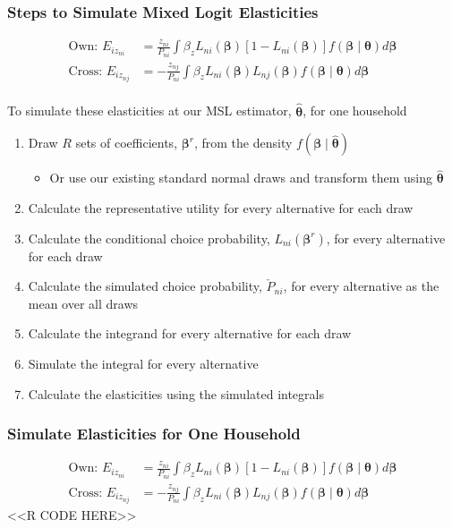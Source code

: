 \documentclass{beamer}
\begin{document}
\begin{frame}\frametitle{Steps to Simulate Mixed Logit Elasticities}
	\vspace{-3ex}
	\begin{align*}
    	\text{Own: } E_{iz_{ni}} & = \frac{z_{ni}}{P_{ni}} \int \beta_z L_{ni}(\bm{\beta}) [1 - L_{ni}(\bm{\beta})] f(\bm{\beta} \mid \bm{\theta}) d \bm{\beta} \\
    	\text{Cross: } E_{iz_{nj}} & = - \frac{z_{nj}}{P_{ni}} \int \beta_z L_{ni}(\bm{\beta}) L_{nj}(\bm{\beta}) f(\bm{\beta} \mid \bm{\theta}) d \bm{\beta}
    \end{align*} \\
    \vspace{-1ex}
    To simulate these elasticities at our MSL estimator, $\widehat{\bm{\theta}}$, for one household
    \begin{enumerate}
        \item Draw $R$ sets of coefficients, $\bm{\beta}^r$, from the density $f(\bm{\beta} \mid \widehat{\bm{\theta}})$
        \begin{itemize}
        	\item Or use our existing standard normal draws and transform them using $\widehat{\bm{\theta}}$
        \end{itemize}
        \item Calculate the representative utility for every alternative for each draw
        \item Calculate the conditional choice probability, $L_{ni}(\bm{\beta}^r)$, for every alternative for each draw
        \item Calculate the simulated choice probability, $\check{P}_{ni}$, for every alternative as the mean over all draws
        \item Calculate the integrand for every alternative for each draw
        \item Simulate the integral for every alternative
        \item Calculate the elasticities using the simulated integrals
    \end{enumerate}
\end{frame}

\begin{frame}[fragile]\frametitle{Simulate Elasticities for One Household}
	\vspace{-3ex}
	\begin{align*}
    	\text{Own: } E_{iz_{ni}} & = \frac{z_{ni}}{P_{ni}} \int \beta_z L_{ni}(\bm{\beta}) [1 - L_{ni}(\bm{\beta})] f(\bm{\beta} \mid \bm{\theta}) d \bm{\beta} \\
    	\text{Cross: } E_{iz_{nj}} & = - \frac{z_{nj}}{P_{ni}} \int \beta_z L_{ni}(\bm{\beta}) L_{nj}(\bm{\beta}) f(\bm{\beta} \mid \bm{\theta}) d \bm{\beta}
    \end{align*}
    <<R CODE HERE>>
\end{frame}
\end{document}
